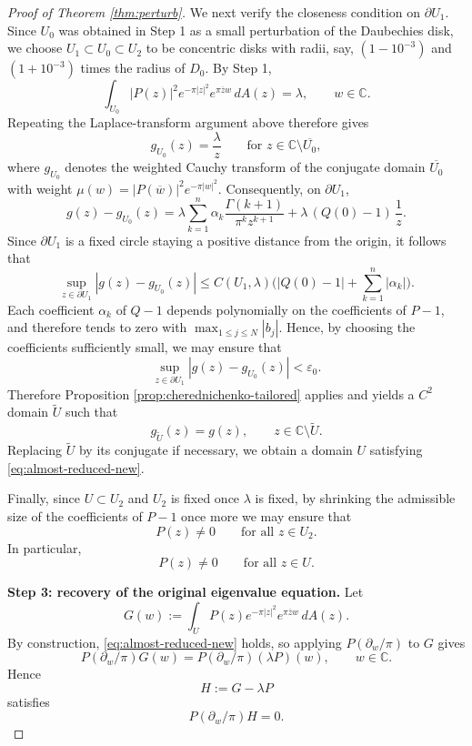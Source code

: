 \documentclass[a4paper,11pt,reqno]{amsart}
\numberwithin{equation}{section}
\theoremstyle{plain} %
\theoremstyle{definition} %
\theoremstyle{remark}
\newcommand{\C}{\mathbb{C}}
\begin{document}
\begin{proof}[Proof of Theorem \ref{thm:perturb}]
We next verify the closeness condition on \(\partial U_1\). Since \(U_0\) was
obtained in Step 1 as a small perturbation of the Daubechies disk, we choose
\(U_1\subset U_0\subset U_2\) to be concentric disks with radii, say,
\((1-10^{-3})\) and \((1+10^{-3})\) times the radius of \(D_0\). By Step 1,
\[
\int_{U_0}|P(z)|^2e^{-\pi|z|^2}e^{\pi \overline zw}\,dA(z)=\lambda,
\qquad w\in \C.
\]
Repeating the Laplace-transform argument above therefore gives
\[
g_{U_0}(z)=\frac{\lambda}{z}
\qquad \text{for } z\in \C\setminus \overline{U_0},
\]
where \(g_{U_0}\) denotes the weighted Cauchy transform of the conjugate domain
\(\overline{U_0}\) with weight \(\mu(w)=|P(\overline w)|^2e^{-\pi|w|^2}\).
Consequently, on \(\partial U_1\),
\[
g(z)-g_{U_0}(z)
=
\lambda \sum_{k=1}^n \alpha_k \frac{\Gamma(k+1)}{\pi^k z^{k+1}}
+
\lambda\,(Q(0)-1)\,\frac1z .
\]
Since \(\partial U_1\) is a fixed circle staying a positive distance from the
origin, it follows that
\[
\sup_{z\in \partial U_1}|g(z)-g_{U_0}(z)|
\le
C(U_1,\lambda)\Big(|Q(0)-1|+\sum_{k=1}^n |\alpha_k|\Big).
\]
Each coefficient \(\alpha_k\) of \(Q-1\) depends polynomially on the
coefficients of \(P-1\), and therefore tends to zero with
\(\max_{1\le j\le N}|b_j|\). Hence, by choosing the coefficients sufficiently
small, we may ensure that
\[
\sup_{z\in \partial U_1}|g(z)-g_{U_0}(z)|<\varepsilon_0.
\]
Therefore Proposition \ref{prop:cherednichenko-tailored} applies and yields a \(C^2\) domain \(\widetilde U\) such that
\[
g_{\widetilde U}(z)=g(z),
\qquad z\in \C\setminus \widetilde U.
\]
Replacing \(\widetilde U\) by its conjugate if necessary, we obtain a domain \(U\) satisfying \eqref{eq:almost-reduced-new}.

Finally, since \(U\subset U_2\) and \(U_2\) is fixed once \(\lambda\) is fixed, by shrinking the admissible size of the coefficients of \(P-1\) once more we may ensure that
\[
P(z)\neq 0
\qquad \text{for all } z\in U_2.
\]
In particular,
\[
P(z)\neq 0
\qquad \text{for all } z\in U.
\]

\medskip
\noindent\textbf{Step 3: recovery of the original eigenvalue equation.} Let
\[
G(w):=\int_U P(z)e^{-\pi|z|^2}e^{\pi \overline z w}\,dA(z).
\]
By construction, \eqref{eq:almost-reduced-new} holds, so applying \(P(\partial_w/\pi)\) to \(G\) gives
\[
P(\partial_w/\pi)G(w)=P(\partial_w/\pi)(\lambda P)(w),
\qquad w\in \C.
\]
Hence
\[
H:=G-\lambda P
\]
satisfies
\[
P(\partial_w/\pi)H=0.
\]


\end{proof}
\end{document}
